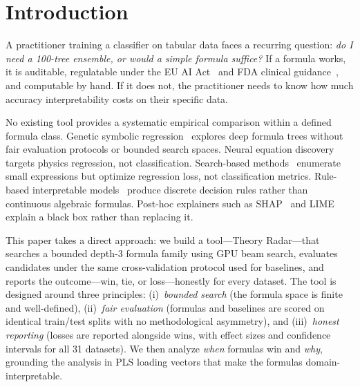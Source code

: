 \documentclass[journal]{IEEEtran}
\begin{document}
\section{Introduction}

A practitioner training a classifier on tabular data faces a
recurring question: \emph{do I need a 100-tree ensemble, or would a
simple formula suffice?}  If a formula works, it is auditable,
regulatable under the EU AI Act~\cite{euaiact2024} and FDA clinical
guidance~\cite{fda2022clinical}, and computable by hand.  If it does
not, the practitioner needs to know how much accuracy
interpretability costs on their specific data.

No existing tool provides a systematic empirical comparison within a
defined formula class.  Genetic symbolic
regression~\cite{schmidt2009distilling,cranmer2023interpretable}
explores deep formula trees without fair evaluation protocols or
bounded search spaces.  Neural equation
discovery~\cite{udrescu2020ai} targets physics regression, not
classification.  Search-based
methods~\cite{kommenda2020search} enumerate small expressions but
optimize regression loss, not classification metrics.  Rule-based
interpretable models~\cite{breiman1984cart,letham2015interpretable,yang2017scalable}
produce discrete decision rules rather than continuous algebraic
formulas.  Post-hoc explainers such as
SHAP~\cite{lundberg2017unified} and LIME~\cite{ribeiro2016should}
explain a black box rather than replacing it.

This paper takes a direct approach: we build a tool---Theory
Radar---that searches a bounded depth-3 formula family using GPU beam search, evaluates
candidates under the same cross-validation protocol used for
baselines, and reports the outcome---win, tie, or loss---honestly
for every dataset.  The tool is designed around three principles:
(i)~\emph{bounded search} (the formula space is finite and
well-defined), (ii)~\emph{fair evaluation} (formulas and baselines
are scored on identical train/test splits with no methodological
asymmetry), and (iii)~\emph{honest reporting} (losses are reported
alongside wins, with effect sizes and confidence intervals for all
31 datasets).  We then analyze \emph{when} formulas win and
\emph{why}, grounding the analysis in PLS loading vectors that make
the formulas domain-interpretable.
\end{document}
